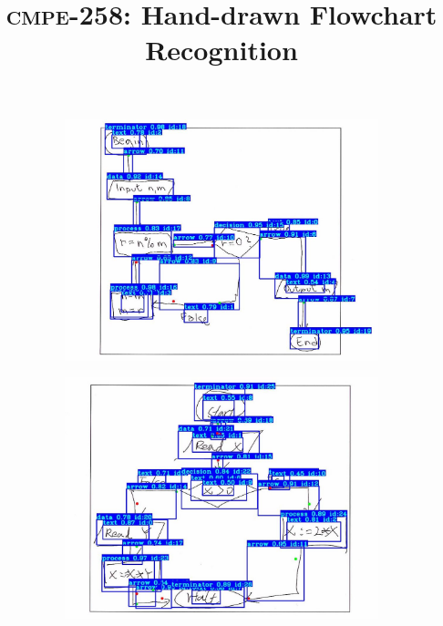 \documentclass[10pt]{article}
\begin{document}
\thispagestyle{empty}

\vspace{-2em}
\title{\huge \textsc{cmpe-258}: Hand-drawn Flowchart Recognition}
\date{}

\vspace{-2em}
\author{}

\maketitle

\vspace{-5em}

\begin{figure}[h]
\centering
\begin{subfigure}{0.32\columnwidth}
\includegraphics[width=\columnwidth]{fc_01.jpeg}
\end{subfigure}
\begin{subfigure}{0.32\columnwidth}
\includegraphics[width=\columnwidth]{fc_02.jpeg}

\end{subfigure}
\end{figure}
\end{document}

